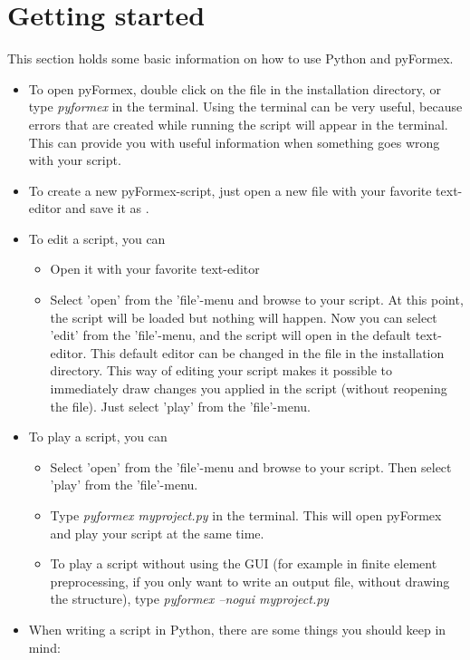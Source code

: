\documentclass[a4paper]{manual}
\newcommand{\pyformex}{pyFormex\xspace}
\begin{document}
{%
\section{Getting started}
\label{sec:getting-started}
This section holds some basic information on how to use Python and \pyformex. 

\begin{itemize}
\item To open \pyformex, double click on the file  in the installation directory, or type \emph{pyformex} in the terminal. Using the terminal can be very useful, because errors that are created while running the script will appear in the terminal. This can provide you with useful information when something goes wrong with your script.
\item To create a new \pyformex-script, just open a new file with your favorite text-editor and save it as .
\item To edit a script, you can
	\begin{itemize}
	\item Open it with your favorite text-editor
	\item Select 'open' from the 'file'-menu and browse to your script. At this point, the script will be loaded but nothing will 		happen. Now you can select 'edit' from the 'file'-menu, and the script will open in the default text-editor. This default editor 		can be changed in the file  in the installation directory.
	This way of editing your script makes it possible to immediately draw changes you applied in the script (without reopening 		the file).  Just select 'play' from the 'file'-menu.
	\end{itemize}
\item To play a script, you can
	\begin{itemize}
	\item Select 'open' from the 'file'-menu and browse to your script. Then select 'play' from the 'file'-menu.
	\item Type \emph{pyformex myproject.py} in the terminal. This will open \pyformex and play your script at the same time.
	\item To play a script without using the GUI (for example in finite element preprocessing, if you only want to write an 		output file, without drawing the structure), type \emph{pyformex --nogui myproject.py}
	\end{itemize}
\item When writing a script in Python, there are some things you should keep in mind:

\end{itemize}}
\end{document}
